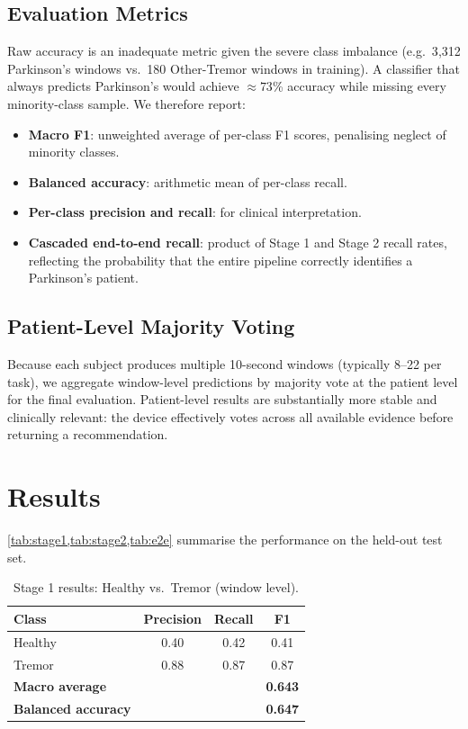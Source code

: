 \documentclass[12pt, a4paper]{article}
\begin{document}
\subsection{Evaluation Metrics}

Raw accuracy is an inadequate metric given the severe class imbalance
(e.g.\ 3{,}312 Parkinson's windows vs.\ 180 Other-Tremor windows in
training). A classifier that always predicts Parkinson's would achieve
$\approx73$\% accuracy while missing every minority-class sample.
We therefore report:
\begin{itemize}
  \item \textbf{Macro F1}: unweighted average of per-class F1 scores,
        penalising neglect of minority classes.
  \item \textbf{Balanced accuracy}: arithmetic mean of per-class recall.
  \item \textbf{Per-class precision and recall}: for clinical
        interpretation.
  \item \textbf{Cascaded end-to-end recall}: product of Stage 1 and
        Stage 2 recall rates, reflecting the probability that the
        entire pipeline correctly identifies a Parkinson's patient.
\end{itemize}

\subsection{Patient-Level Majority Voting}

Because each subject produces multiple 10-second windows (typically
8--22 per task), we aggregate window-level predictions by majority
vote at the patient level for the final evaluation. Patient-level
results are substantially more stable and clinically relevant: the
device effectively votes across all available evidence before returning
a recommendation.

\section{Results}
\label{sec:results}

\cref{tab:stage1,tab:stage2,tab:e2e} summarise the performance on
the held-out test set.

\begin{table}[htbp]
  \centering
  \caption{Stage 1 results: Healthy vs.\ Tremor (window level).}
  \label{tab:stage1}
  \begin{tabular}{lccc}
    \toprule
    Class & Precision & Recall & F1 \\
    \midrule
    Healthy & 0.40 & 0.42 & 0.41 \\
    Tremor  & 0.88 & 0.87 & 0.87 \\
    \midrule
    \textbf{Macro average} & & & \textbf{0.643} \\
    \textbf{Balanced accuracy} & & & \textbf{0.647} \\
    \bottomrule
  \end{tabular}
\end{table}
\end{document}
